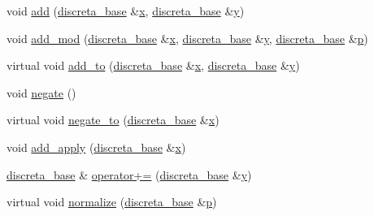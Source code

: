 \begin{DoxyCompactItemize}
void \mbox{\hyperlink{classdiscreta__base_a209e98b4fef96cb922b3caa49cd70a79}{add}} (\mbox{\hyperlink{classdiscreta__base}{discreta\+\_\+base}} \&\mbox{\hyperlink{alphabet2_8_c_a6150e0515f7202e2fb518f7206ed97dc}{x}}, \mbox{\hyperlink{classdiscreta__base}{discreta\+\_\+base}} \&\mbox{\hyperlink{alphabet2_8_c_a0a2f84ed7838f07779ae24c5a9086d33}{y}})
\item 
void \mbox{\hyperlink{classdiscreta__base_aa8864b3f228cad737b2f3ff469bd8f63}{add\+\_\+mod}} (\mbox{\hyperlink{classdiscreta__base}{discreta\+\_\+base}} \&\mbox{\hyperlink{alphabet2_8_c_a6150e0515f7202e2fb518f7206ed97dc}{x}}, \mbox{\hyperlink{classdiscreta__base}{discreta\+\_\+base}} \&\mbox{\hyperlink{alphabet2_8_c_a0a2f84ed7838f07779ae24c5a9086d33}{y}}, \mbox{\hyperlink{classdiscreta__base}{discreta\+\_\+base}} \&\mbox{\hyperlink{alphabet2_8_c_a533391314665d6bf1b5575e9a9cd8552}{p}})
\item 
virtual void \mbox{\hyperlink{classdiscreta__base_a712a61311eb036d70a52871ed315f515}{add\+\_\+to}} (\mbox{\hyperlink{classdiscreta__base}{discreta\+\_\+base}} \&\mbox{\hyperlink{alphabet2_8_c_a6150e0515f7202e2fb518f7206ed97dc}{x}}, \mbox{\hyperlink{classdiscreta__base}{discreta\+\_\+base}} \&\mbox{\hyperlink{alphabet2_8_c_a0a2f84ed7838f07779ae24c5a9086d33}{y}})
\item 
void \mbox{\hyperlink{classdiscreta__base_aac1be1125008f8a93a3083cd1a43878d}{negate}} ()
\item 
virtual void \mbox{\hyperlink{classdiscreta__base_a65ad2034f2f4518d424b814974018a03}{negate\+\_\+to}} (\mbox{\hyperlink{classdiscreta__base}{discreta\+\_\+base}} \&\mbox{\hyperlink{alphabet2_8_c_a6150e0515f7202e2fb518f7206ed97dc}{x}})
\item 
void \mbox{\hyperlink{classdiscreta__base_a1e8b73324062c6ff9e01aaf5fb6e8fba}{add\+\_\+apply}} (\mbox{\hyperlink{classdiscreta__base}{discreta\+\_\+base}} \&\mbox{\hyperlink{alphabet2_8_c_a6150e0515f7202e2fb518f7206ed97dc}{x}})
\item 
\mbox{\hyperlink{classdiscreta__base}{discreta\+\_\+base}} \& \mbox{\hyperlink{classdiscreta__base_ad0b0a337ccba39d87fe21ffe15bef951}{operator+=}} (\mbox{\hyperlink{classdiscreta__base}{discreta\+\_\+base}} \&\mbox{\hyperlink{alphabet2_8_c_a0a2f84ed7838f07779ae24c5a9086d33}{y}})
\item 
virtual void \mbox{\hyperlink{classdiscreta__base_acd46a488505c6086b5bc019550e5e313}{normalize}} (\mbox{\hyperlink{classdiscreta__base}{discreta\+\_\+base}} \&\mbox{\hyperlink{alphabet2_8_c_a533391314665d6bf1b5575e9a9cd8552}{p}})
\item 

\end{DoxyCompactItemize}
